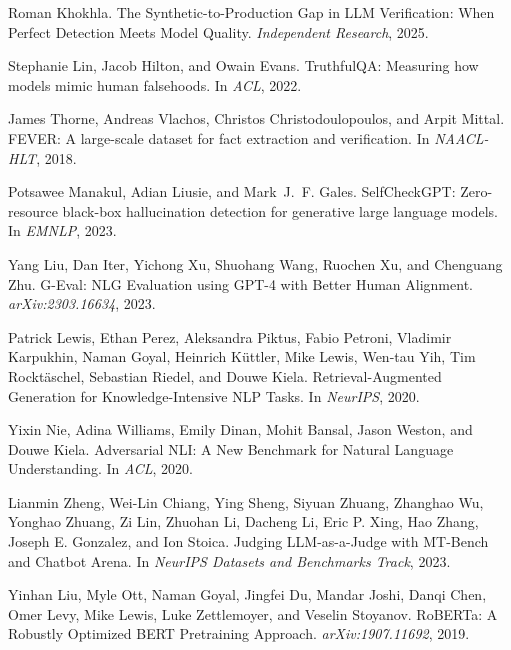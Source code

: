 \documentclass[11pt]{article}
\begin{document}

\begin{thebibliography}{20}

Roman Khokhla.
\newblock The Synthetic-to-Production Gap in LLM Verification: When Perfect Detection Meets Model Quality.
\newblock \emph{Independent Research}, 2025.

Stephanie Lin, Jacob Hilton, and Owain Evans.
\newblock TruthfulQA: Measuring how models mimic human falsehoods.
\newblock In \emph{ACL}, 2022.

James Thorne, Andreas Vlachos, Christos Christodoulopoulos, and Arpit Mittal.
\newblock FEVER: A large-scale dataset for fact extraction and verification.
\newblock In \emph{NAACL-HLT}, 2018.

Potsawee Manakul, Adian Liusie, and Mark~J.~F. Gales.
\newblock SelfCheckGPT: Zero-resource black-box hallucination detection for generative large language models.
\newblock In \emph{EMNLP}, 2023.

Yang Liu, Dan Iter, Yichong Xu, Shuohang Wang, Ruochen Xu, and Chenguang Zhu.
\newblock G-Eval: NLG Evaluation using GPT-4 with Better Human Alignment.
\newblock \emph{arXiv:2303.16634}, 2023.

Patrick Lewis, Ethan Perez, Aleksandra Piktus, Fabio Petroni, Vladimir Karpukhin, Naman Goyal, Heinrich K\"{u}ttler, Mike Lewis, Wen-tau Yih, Tim Rockt\"{a}schel, Sebastian Riedel, and Douwe Kiela.
\newblock Retrieval-Augmented Generation for Knowledge-Intensive NLP Tasks.
\newblock In \emph{NeurIPS}, 2020.

Yixin Nie, Adina Williams, Emily Dinan, Mohit Bansal, Jason Weston, and Douwe Kiela.
\newblock Adversarial NLI: A New Benchmark for Natural Language Understanding.
\newblock In \emph{ACL}, 2020.

Lianmin Zheng, Wei-Lin Chiang, Ying Sheng, Siyuan Zhuang, Zhanghao Wu, Yonghao Zhuang, Zi Lin, Zhuohan Li, Dacheng Li, Eric P. Xing, Hao Zhang, Joseph E. Gonzalez, and Ion Stoica.
\newblock Judging LLM-as-a-Judge with MT-Bench and Chatbot Arena.
\newblock In \emph{NeurIPS Datasets and Benchmarks Track}, 2023.

Yinhan Liu, Myle Ott, Naman Goyal, Jingfei Du, Mandar Joshi, Danqi Chen, Omer Levy, Mike Lewis, Luke Zettlemoyer, and Veselin Stoyanov.
\newblock RoBERTa: A Robustly Optimized BERT Pretraining Approach.
\newblock \emph{arXiv:1907.11692}, 2019.


\end{thebibliography}
\end{document}
